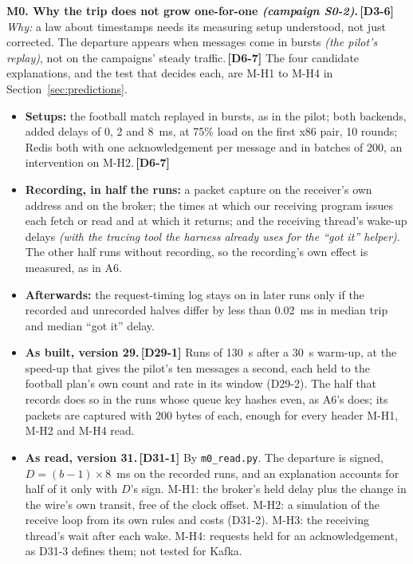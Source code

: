 \documentclass[11pt]{article}
\newcommand{\gl}[1]{{\color{soft}\itshape\small (#1)}}
\newcommand{\chgold}[1]{\,{\color{oldcol}\bfseries\footnotesize[#1]}}
\begin{document}
\textbf{M0. Why the trip does not grow one-for-one \gl{campaign S0-2}.}\chgold{D3-6} \emph{Why:} a law about timestamps needs its measuring setup understood, not just corrected. The departure appears when messages come in bursts \gl{the pilot's replay}, not on the campaigns' steady traffic.\chgold{D6-7} The four candidate explanations, and the test that decides each, are M-H1 to M-H4 in Section~\ref{sec:predictions}.
\begin{itemize}
  \item \textbf{Setups:} the football match replayed in bursts, as in the pilot; both backends, added delays of 0, 2 and 8~ms, at 75\% load on the first x86 pair, 10 rounds; Redis both with one acknowledgement per message and in batches of 200, an intervention on M-H2.\chgold{D6-7}
  \item \textbf{Recording, in half the runs:} a packet capture on the receiver's own address and on the broker; the times at which our receiving program issues each fetch or read and at which it returns; and the receiving thread's wake-up delays \gl{with the tracing tool the harness already uses for the ``got it'' helper}. The other half runs without recording, so the recording's own effect is measured, as in A6.
  \item \textbf{Afterwards:} the request-timing log stays on in later runs only if the recorded and unrecorded halves differ by less than 0.02~ms in median trip and median ``got it'' delay.
  \item \textbf{As built, version 29.}\chgold{D29-1} Runs of 130~s after a 30~s warm-up, at the speed-up that gives the pilot's ten messages a second, each held to the football plan's own count and rate in its window (D29-2). The half that records does so in the runs whose queue key hashes even, as A6's does; its packets are captured with 200 bytes of each, enough for every header M-H1, M-H2 and M-H4 read.
  \item \textbf{As read, version 31.}\chgold{D31-1} By \texttt{m0\_read.py}. The departure is signed, $D = (b - 1) \times 8$~ms on the recorded runs, and an explanation accounts for half of it only with $D$'s sign. M-H1: the broker's held delay plus the change in the wire's own transit, free of the clock offset. M-H2: a simulation of the receive loop from its own rules and costs (D31-2). M-H3: the receiving thread's wait after each wake. M-H4: requests held for an acknowledgement, as D31-3 defines them; not tested for Kafka.
\end{itemize}
\end{document}
